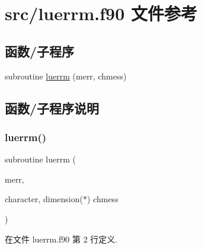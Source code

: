 \hypertarget{luerrm_8f90}{}\section{src/luerrm.f90 文件参考}
\label{luerrm_8f90}
\subsection*{函数/子程序}
\begin{DoxyCompactItemize}
\item 
subroutine \mbox{\hyperlink{luerrm_8f90_a7644783b7a59f589078818082b42f3eb}{luerrm}} (merr, chmess)
\end{DoxyCompactItemize}


\subsection{函数/子程序说明}
\mbox{\label{luerrm_8f90_a7644783b7a59f589078818082b42f3eb}} 
\subsubsection{\texorpdfstring{luerrm()}{luerrm()}}
{\footnotesize\ttfamily subroutine luerrm (\begin{DoxyParamCaption}\item[{}]{merr,  }\item[{character, dimension($\ast$)}]{chmess }\end{DoxyParamCaption})}



在文件 luerrm.\+f90 第 2 行定义.

